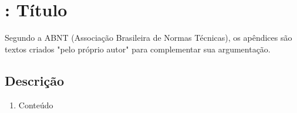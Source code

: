\section{: Título}
Segundo a ABNT (Associação Brasileira de Normas Técnicas), os apêndices são textos criados "pelo próprio autor" para complementar sua argumentação.
    \subsection*{Descrição}
        \begin{enumerate}
            \item Conteúdo
        \end{enumerate}        
        

